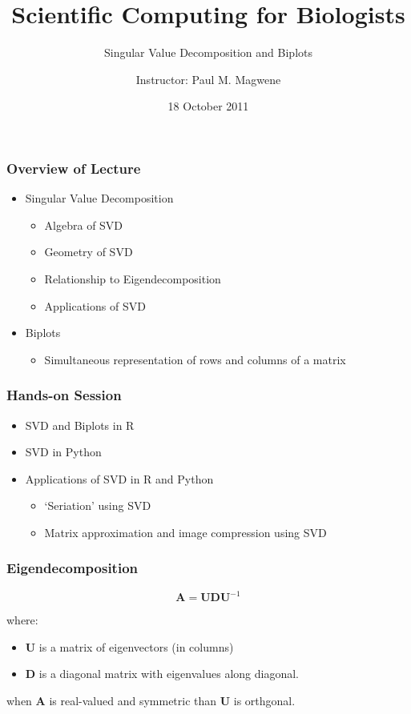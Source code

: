 \documentclass{beamer}
\title{Scientific Computing for Biologists}
\subtitle{Singular Value Decomposition and Biplots}
\author{Instructor: Paul M. Magwene}
\date{18 October 2011}
\newcommand{\Mtx}[1]{\ensuremath{\mathbf{#1}}}
\newcommand{\InvMtx}[1]{\ensuremath{\mathbf{#1}^{-1}}}
\begin{document}
\begin{frame}
\titlepage
\end{frame}

\begin{frame}
  \frametitle{Overview of Lecture}
  
\begin{itemize}
		\item Singular Value Decomposition
		\begin{itemize}
			\item Algebra of SVD
			\item Geometry of SVD
			\item Relationship to Eigendecomposition
			\item Applications of SVD			
		\end{itemize}		
		\item Biplots
		\begin{itemize}
			\item Simultaneous representation of rows and columns of a matrix
		\end{itemize}			
\end{itemize}

\end{frame}

\begin{frame}
  \frametitle{Hands-on Session}
\begin{itemize}
    \item SVD and Biplots in R
    \item SVD in Python
    \item Applications of SVD in R and Python
    		\begin{itemize}
    		\item `Seriation' using SVD
			\item Matrix approximation and image compression using SVD
		\end{itemize}
\end{itemize} 


\end{frame}		


\begin{frame}
  \frametitle{Eigendecomposition}

$$ \Mtx{A} = \Mtx{U}\Mtx{D}\InvMtx{U} $$

where:
\begin{itemize}
\item  $\Mtx{U}$ is a matrix of eigenvectors (in columns)
\item $\Mtx{D}$ is a diagonal matrix with eigenvalues along diagonal.
\end{itemize}

\medskip
when $\Mtx{A}$ is real-valued and symmetric than $\Mtx{U}$ is orthgonal.

\end{frame}
\end{document}
